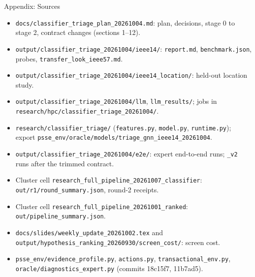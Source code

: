 \documentclass[aspectratio=169]{beamer}
\begin{document}
\begin{frame}{Appendix: Sources}
  \scriptsize
  \begin{itemize}
    \setlength\itemsep{0.15em}
    \item[S1] \texttt{docs/classifier\_triage\_plan\_20261004.md}: plan, decisions, stage 0 to stage 2, contract changes (sections 1--12).
    \item[S2] \texttt{output/classifier\_triage\_20261004/ieee14/}: \texttt{report.md}, \texttt{benchmark.json}, probes, \texttt{transfer\_look\_ieee57.md}.
    \item[S3] \texttt{output/classifier\_triage\_20261004/ieee14\_location/}: held-out location study.
    \item[S4] \texttt{output/classifier\_triage\_20261004/llm}, \texttt{llm\_results/}; jobs in \texttt{research/hpc/classifier\_triage\_20261004/}.
    \item[S5] \texttt{research/classifier\_triage/} (\texttt{features.py}, \texttt{model.py}, \texttt{runtime.py}); export \texttt{psse\_env/oracle/models/triage\_gnn\_ieee14\_20261004}.
    \item[S6] \texttt{output/classifier\_triage\_20261004/e2e/}: expert end-to-end runs; \texttt{\_v2} runs after the trimmed contract.
    \item[S7] Cluster cell \texttt{research\_full\_pipeline\_20261007\_classifier}: \texttt{out/r1/round\_summary.json}, round-2 receipts.
    \item[S8] Cluster cell \texttt{research\_full\_pipeline\_20261001\_ranked}: \texttt{out/pipeline\_summary.json}.
    \item[S9] \texttt{docs/slides/weekly\_update\_20261002.tex} and \texttt{output/hypothesis\_ranking\_20260930/screen\_cost/}: screen cost.
    \item[S10] \texttt{psse\_env/evidence\_profile.py}, \texttt{actions.py}, \texttt{transactional\_env.py}, \texttt{oracle/diagnostics\_expert.py} (commits 18c15f7, 11b7ad5).
  \end{itemize}
\end{frame}
\end{document}
